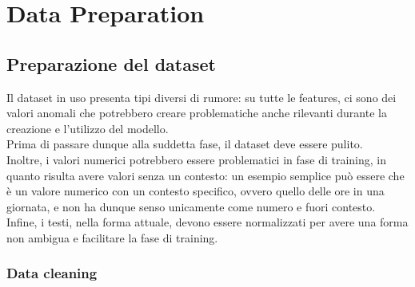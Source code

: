 \documentclass[a4paper,12pt]{report}
\begin{document}
\begingroup%
\makeatletter%
\let\clearpage\relax%
\vspace*{\fill}%
\vspace*{\dimexpr-50\p@-\baselineskip}%
\chapter{Data Preparation}
\vspace*{\fill}%
\endgroup
\newpage

\section{Preparazione del dataset}
Il dataset in uso presenta tipi diversi di rumore: su tutte le features, ci sono dei valori anomali che potrebbero creare problematiche anche rilevanti durante la creazione e l'utilizzo del modello.\\
Prima di passare dunque alla suddetta fase, il dataset deve essere pulito.\\
Inoltre, i valori numerici potrebbero essere problematici in fase di training, in quanto risulta avere valori senza un contesto: un esempio semplice può essere \texttt{\color{red}{upload\_hour}} che è un valore numerico con un contesto specifico, ovvero quello delle ore in una giornata, e non ha dunque senso unicamente come numero e fuori contesto.\\
Infine, i testi, nella forma attuale, devono essere normalizzati per avere una forma non ambigua e facilitare la fase di training.

\subsection{Data cleaning}
\end{document}
